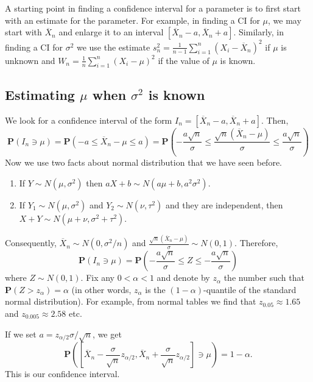 \documentclass[preprint,  11pt]{amsart}
\theoremstyle{plain} %
\theoremstyle{definition} %
\begin{document}
A starting point in finding a confidence interval for a parameter is to first start with an estimate for the parameter. For example, in finding a CI for $\mu$, we may start with $\overline{X}_{n}$ and enlarge it to an interval $[\overline{X}_{n}-a,\overline{X}_{n}+a]$. Similarly, in finding a CI for ${\sigma}^{2}$ we use the estimate $s_{n}^{2}=\frac{1}{n-1}\sum_{i=1}^{n}(X_{i}-\overline{X}_{n})^{2}$ if $\mu$ is unknown and $W_{n}=\frac{1}{n}\sum_{i=1}^{n}(X_{i}-\mu)^{2}$ if the value of $\mu$ is known.

\subsection{Estimating $\mu$ when ${\sigma}^{2}$ is known} We look for a confidence interval of the form $I_{n}=[\overline{X}_{n}-a,\overline{X}_{n}+a]$. Then,
$$
\mathbf{P}\left(I_{n}\ni \mu\right) = \mathbf{P}\left(-a\le \overline{X}_{n}-\mu\le a\right) =\mathbf{P}\left(-\frac{a\sqrt{n}}{{\sigma}}\le \frac{\sqrt{n}(\overline{X}_{n}-\mu)}{{\sigma}} \le \frac{a\sqrt{n}}{{\sigma}}\right)
$$
Now we use two facts about normal distribution that we have seen before. 
\begin{enumerate}\setlength\itemsep{6pt}
\item If $Y\sim N(\mu,{\sigma}^{2})$ then $aX+b\sim N(a\mu+b,a^{2}{\sigma}^{2})$. 
\item If $Y_{1}\sim N(\mu,{\sigma}^{2})$ and $Y_{2}\sim N(\nu,\tau^{2})$ and they are independent, then $X+Y\sim N(\mu+\nu,{\sigma}^{2}+\tau^{2})$. 
\end{enumerate}
Consequently, $\overline{X}_{n}\sim N(0,{\sigma}^{2}/n)$ and $\frac{\sqrt{n}(\overline{X}_{n}-\mu)}{{\sigma}}\sim N(0,1)$. 
Therefore, 
$$
 \mathbf{P}\left(I_{n}\ni \mu\right)
 = \mathbf{P}(-\frac{a\sqrt{n}}{{\sigma}}\le Z\le -\frac{a\sqrt{n}}{{\sigma}})
$$
 where $Z\sim N(0,1)$. Fix any $0<\alpha<1$ and denote by $z_{\alpha}$ the number such that $\mathbf{P}(Z>z_{\alpha})=\alpha$ (in other words, $z_{\alpha}$ is the $(1-\alpha)$-quantile of the standard normal distribution). For example, from normal tables we find that $z_{0.05}\approx1.65$ and $z_{0.005}\approx 2.58$ etc.
 
  If we set $a=z_{\alpha/2}{\sigma}/\sqrt{n}$, we get 
$$
\mathbf{P}\left(\left[\overline{X}_{n}-\frac{{\sigma}}{\sqrt{n}}z_{\alpha/2},\overline{X}_{n}+\frac{{\sigma}}{\sqrt{n}}z_{\alpha/2}\right]\ni \mu\right)=1-\alpha.
$$
This is our confidence interval.
\end{document}
